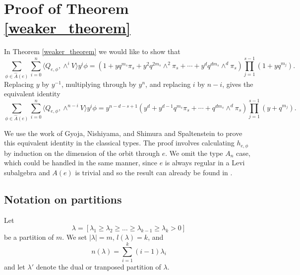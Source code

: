 \documentclass[10pt]{amsart}
\newcommand{\ar}{{\hat{A}}(e)}
\newcommand{\dualp}{\lambda'}
\theoremstyle{plain}
\theoremstyle{definition}
\theoremstyle{remark}
\begin{document}
\section{Proof of Theorem \ref{weaker_theorem} }


In Theorem \ref{weaker_theorem}  we would like to show that
$$\sum_{\phi \in \ar}  \sum^n_{i=0} \langle Q_{e, \phi}, \wedge^i V \rangle  y^i \phi=  
(1 + yq^{m_s}\pi_s + y^2 q^{2m_s}\!\wedge^2 \! \pi_s + \cdots + y^d q^{dm_s} \! \wedge^d \! \pi_s) \prod_{j=1}^{s-1} (1+yq^{m_j}). $$
Replacing $y$ by $y^{-1}$, multiplying through by $y^{n}$, and replacing $i$ by $n-i$, gives the equivalent identity
\begin{equation} \label{theorem:variant}
\sum_{\phi \in \ar}  \sum^n_{i=0}   \langle Q_{e, \phi}, \wedge^{n-i} V \rangle  y^i \phi  =  
y^{n-d-s+1}  (y^d + y^{d-1} q^{m_s}\pi_s + %
\cdots + q^{dm_s} \! \wedge^d \! \pi_s) \prod_{j=1}^{s-1} (y + q^{m_j}).
\end{equation}

We use the work of Gyoja, Nishiyama, and Shimura \cite{gyoja:invariants1} and Spaltenstein \cite{spaltenstein:reflection} to prove this equivalent identity in the classical types.  The proof involves 
calculating $h_{e, \phi}$ by induction on the dimension of the orbit through $e$.   
We omit the type $A_n$ case, which could be handled in the same manner, since $e$ is always regular in a Levi subalgebra and $A(e)$ is trivial and so the result can already be found in \cite{henderson:exterior}.

\subsection{Notation on partitions}

Let $$\lambda = [\lambda_1 \geq \lambda_2 \geq \dots \geq \lambda_{k-1} \geq \lambda_k > 0]$$
be a partition of $m$.
We set $|\lambda| = m$, $l(\lambda) = k$, and 
$$n(\lambda) = \sum_{i=1}^k (i-1)\lambda_i$$
and let $\dualp$ denote the dual or tranposed partition of $\lambda$.
\end{document}
